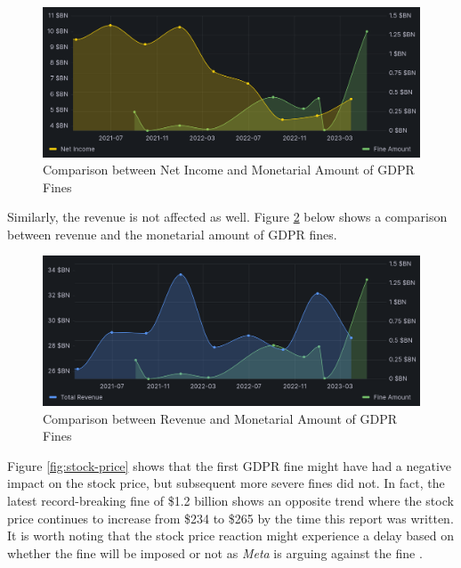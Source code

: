 \documentclass[12pt, a4paper]{article}
\begin{document}
\begin{figure}[H]
    \centering
    \includegraphics[width=1.00\textwidth]{rel-fines-net-income}
    \caption{Comparison between Net Income and Monetarial Amount of GDPR Fines}
    \label{fig:rel-fines-net-income}
\end{figure}

Similarly, the revenue is not affected as well. Figure
\ref{fig:rel-fines-revenue} below shows a comparison between revenue and the
monetarial amount of GDPR fines.

\begin{figure}[H]
    \centering
    \includegraphics[width=1.00\textwidth]{rel-fines-revenue}
    \caption{Comparison between Revenue and Monetarial Amount of GDPR Fines}
    \label{fig:rel-fines-revenue}
\end{figure}

Figure \ref{fig:stock-price} shows that the first GDPR fine might have had a
negative impact on the stock price, but subsequent more severe fines did not. In
fact, the latest record-breaking fine of \$1.2 billion shows an opposite trend
where the stock price continues to increase from \$234 to \$265 by the time this
report was written. It is worth noting that the stock price reaction might
experience a delay based on whether the fine will be imposed or not as
\textit{Meta} is arguing against the fine \cite{metaArgueFine}.
\end{document}
